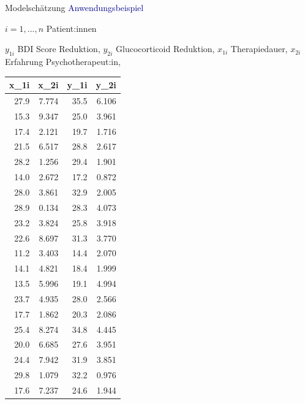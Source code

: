 \documentclass[
  8pt,
  ignorenonframetext,
]{beamer}
\begin{document}
\begin{frame}{Modelschätzung}
\protect\hypertarget{modelschuxe4tzung-1}{}
\textcolor{darkblue}{Anwendungsbeispiel}

\footnotesize

\(i = 1,...,n\) Patient:innen

\center

\(y_{1i}\) BDI Score Reduktion, \(y_{2i}\) Glucocorticoid Reduktion,
\(x_{1i}\) Therapiedauer, \(x_{2i}\) Erfahrung Psychotherapeut:in,


\begin{longtable}[]{@{}rrrr@{}}
\toprule()
x\_1i & x\_2i & y\_1i & y\_2i \\
\midrule()
\endhead
27.9 & 7.774 & 35.5 & 6.106 \\
15.3 & 9.347 & 25.0 & 3.961 \\
17.4 & 2.121 & 19.7 & 1.716 \\
21.5 & 6.517 & 28.8 & 2.617 \\
28.2 & 1.256 & 29.4 & 1.901 \\
14.0 & 2.672 & 17.2 & 0.872 \\
28.0 & 3.861 & 32.9 & 2.005 \\
28.9 & 0.134 & 28.3 & 4.073 \\
23.2 & 3.824 & 25.8 & 3.918 \\
22.6 & 8.697 & 31.3 & 3.770 \\
11.2 & 3.403 & 14.4 & 2.070 \\
14.1 & 4.821 & 18.4 & 1.999 \\
13.5 & 5.996 & 19.1 & 4.994 \\
23.7 & 4.935 & 28.0 & 2.566 \\
17.7 & 1.862 & 20.3 & 2.086 \\
25.4 & 8.274 & 34.8 & 4.445 \\
20.0 & 6.685 & 27.6 & 3.951 \\
24.4 & 7.942 & 31.9 & 3.851 \\
29.8 & 1.079 & 32.2 & 0.976 \\
17.6 & 7.237 & 24.6 & 1.944 \\
\bottomrule()
\end{longtable}
\end{frame}
\end{document}
